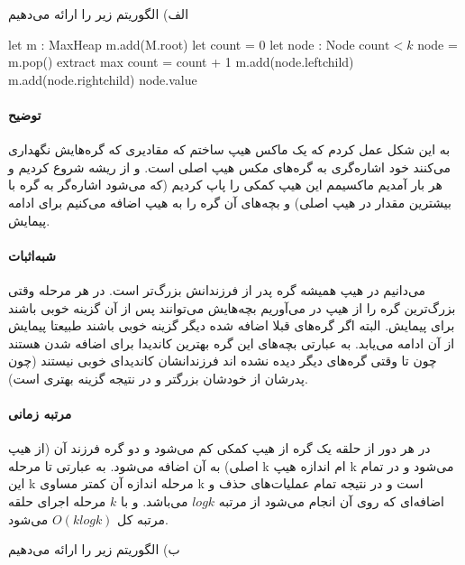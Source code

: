 الف)
الگوریتم زیر را ارائه می‌دهیم

\begin{latin}
\begin{codebox}
		\li let m : MaxHeap
		\li m.add(M.root)
		\li let count = 0
		\li let node : Node
		\li \While $\text{count} < k$ \Then
			\li node = m.pop() \Comment extract max
			\li count = count + 1
			\li m.add(node.leftchild)
			\li m.add(node.rightchild)
		\End
		\li \Return node.value
	\End
\end{codebox}
\end{latin}

\paragraph{توضیح}
به این شکل عمل کردم که یک ماکس هیپ ساختم که مقادیری که گره‌هایش نگهداری می‌کنند خود اشاره‌گری به گره‌های مکس هیپ اصلی است. و از ریشه شروع کردیم و هر بار آمدیم ماکسیمم این هیپ کمکی را پاپ کردیم (که می‌شود اشاره‌گر به گره با بیشترین مقدار در هیپ اصلی) و بچه‌های آن گره را به هیپ اضافه می‌کنیم برای ادامه پیمایش.

\paragraph{شبه‌اثبات}
می‌دانیم در هیپ همیشه گره پدر از فرزندانش بزرگ‌تر است. در هر مرحله وقتی بزرگ‌ترین گره را از هیپ در می‌آوریم بچه‌هایش می‌توانند پس از آن گزینه خوبی باشند برای پیمایش. البته اگر گره‌های قبلا اضافه شده دیگر گزینه خوبی باشند طبیعتا پیمایش از آن ادامه می‌یابد.
به عبارتی بچه‌های
این گره بهترین کاندیدا برای اضافه شدن هستند چون تا وقتی گره‌های دیگر دیده نشده اند فرزندانشان کاندیدای خوبی نیستند (چون پدرشان از خودشان بزرگتر و در نتیجه گزینه بهتری است).

\paragraph{مرتبه زمانی}
در هر دور از حلقه یک گره از هیپ کمکی کم می‌شود و دو گره فرزند آن (از هیپ اصلی) به آن اضافه می‌شود. به عبارتی تا مرحله 
k
ام اندازه هیپ k 
می‌شود و در تمام این k مرحله اندازه آن 
کمتر مساوی 
k 
است و در نتیجه تمام عملیا‌ت‌های حذف و اضافه‌ای که روی آن انجام می‌شود
از مرتبه 
$log k$
می‌باشد.
و با  
$k$
مرحله اجرای حلقه مرتبه کل 
$O(klogk)$
می‌شود.
 

ب)
الگوریتم زیر را ارائه می‌دهیم

